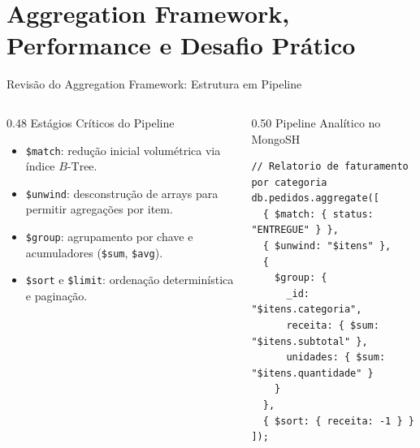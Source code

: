 \section[Aggregation e Desafio Integrado]{Aggregation Framework, Performance e Desafio Prático}

\begin{frame}[fragile]{Revisão do Aggregation Framework: Estrutura em Pipeline}
  \vspace{0.1cm}
  \begin{columns}[t,onlytextwidth]
    \begin{column}{0.48\textwidth}
      \alert{Estágios Críticos do Pipeline}\par
      \footnotesize
      \begin{itemize}
        \item \lstinline[language=mongosh, basicstyle=\footnotesize\ttfamily]|$match|: redução inicial volumétrica via índice $B\text{-Tree}$.
        \item \lstinline[language=mongosh, basicstyle=\footnotesize\ttfamily]|$unwind|: desconstrução de arrays para permitir agregações por item.
        \item \lstinline[language=mongosh, basicstyle=\footnotesize\ttfamily]|$group|: agrupamento por chave e acumuladores (\lstinline[language=mongosh, basicstyle=\footnotesize\ttfamily]|$sum|, \lstinline[language=mongosh, basicstyle=\footnotesize\ttfamily]|$avg|).
        \item \lstinline[language=mongosh, basicstyle=\footnotesize\ttfamily]|$sort| e \lstinline[language=mongosh, basicstyle=\footnotesize\ttfamily]|$limit|: ordenação determinística e paginação.
      \end{itemize}
    \end{column}
    
    \begin{column}{0.50\textwidth}
      \alert{Pipeline Analítico no MongoSH}\par
      \vspace{0.05cm}
      \begin{lstlisting}[language=mongosh]
// Relatorio de faturamento por categoria
db.pedidos.aggregate([
  { $match: { status: "ENTREGUE" } },
  { $unwind: "$itens" },
  {
    $group: {
      _id: "$itens.categoria",
      receita: { $sum: "$itens.subtotal" },
      unidades: { $sum: "$itens.quantidade" }
    }
  },
  { $sort: { receita: -1 } }
]);
      \end{lstlisting}
    \end{column}
  \end{columns}
\end{frame}

